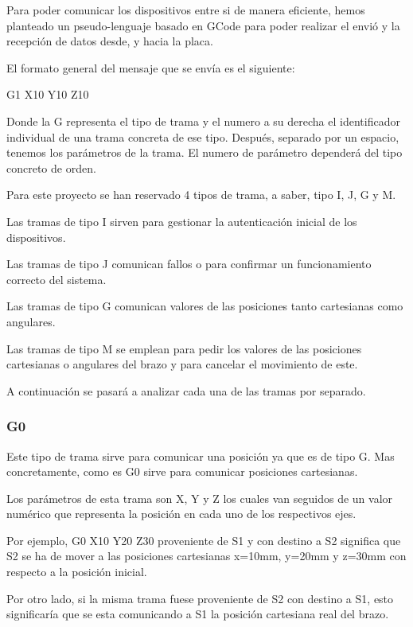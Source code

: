 Para poder comunicar los dispositivos entre si de manera eficiente, hemos planteado un pseudo-lenguaje basado en GCode para poder realizar el envió y la recepción de datos desde, y hacia la placa.

El formato general del mensaje que se envía es el siguiente:

\begin{center}
    {\Large G1 X10 Y10 Z10}
\end{center}

Donde la G representa el tipo de trama y el numero a su derecha el identificador individual de una trama concreta de ese tipo.
Después, separado por un espacio, tenemos los parámetros de la trama. El numero de parámetro dependerá del tipo concreto de orden.

Para este proyecto se han reservado 4 tipos de trama, a saber, tipo I, J, G y M.

Las tramas de tipo I sirven para gestionar la autenticación inicial de los dispositivos.

Las tramas de tipo J comunican fallos o para confirmar un funcionamiento correcto del sistema.

Las tramas de tipo G comunican valores de las posiciones tanto cartesianas como angulares.

Las tramas de tipo M se emplean para pedir los valores de las posiciones cartesianas o angulares del brazo y para cancelar el movimiento de este.

A continuación se pasará a analizar cada una de las tramas por separado.

\subsubsection{G0}
Este tipo de trama sirve para comunicar una posición ya que es de tipo G. Mas concretamente, como es G0 sirve para comunicar posiciones cartesianas.

Los parámetros de esta trama son X, Y y Z los cuales van seguidos de un valor numérico que representa la posición en cada uno de los respectivos ejes.

Por ejemplo, G0 X10 Y20 Z30 proveniente de \ac{S1} y con destino a \ac{S2} significa que \ac{S2} se ha de mover a las posiciones cartesianas x=10mm, y=20mm y z=30mm con respecto a la posición inicial.

Por otro lado, si la misma trama fuese proveniente de \ac{S2} con destino a \ac{S1}, esto significaría que se esta comunicando a \ac{S1} la posición cartesiana real del brazo.

